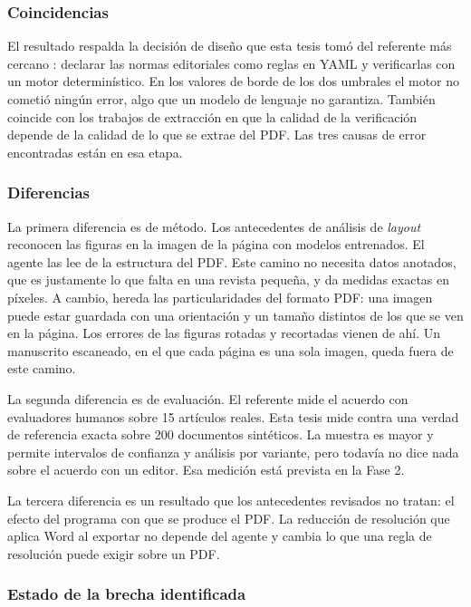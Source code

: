 \subsubsection*{Coincidencias}

El resultado respalda la decisión de diseño que esta tesis tomó del referente más cercano \cite{ref9}: declarar las normas editoriales como reglas en YAML y verificarlas con un motor determinístico. En los valores de borde de los dos umbrales el motor no cometió ningún error, algo que un modelo de lenguaje no garantiza. También coincide con los trabajos de extracción \cite{ref4} en que la calidad de la verificación depende de la calidad de lo que se extrae del PDF. Las tres causas de error encontradas están en esa etapa.

\subsubsection*{Diferencias}

La primera diferencia es de método. Los antecedentes de análisis de \emph{layout} \cite{ref17,ref21} reconocen las figuras en la imagen de la página con modelos entrenados. El agente las lee de la estructura del PDF. Este camino no necesita datos anotados, que es justamente lo que falta en una revista pequeña, y da medidas exactas en píxeles. A cambio, hereda las particularidades del formato PDF: una imagen puede estar guardada con una orientación y un tamaño distintos de los que se ven en la página. Los errores de las figuras rotadas y recortadas vienen de ahí. Un manuscrito escaneado, en el que cada página es una sola imagen, queda fuera de este camino.

La segunda diferencia es de evaluación. El referente \cite{ref9} mide el acuerdo con evaluadores humanos sobre 15 artículos reales. Esta tesis mide contra una verdad de referencia exacta sobre 200 documentos sintéticos. La muestra es mayor y permite intervalos de confianza y análisis por variante, pero todavía no dice nada sobre el acuerdo con un editor. Esa medición está prevista en la Fase 2.

La tercera diferencia es un resultado que los antecedentes revisados no tratan: el efecto del programa con que se produce el PDF. La reducción de resolución que aplica Word al exportar no depende del agente y cambia lo que una regla de resolución puede exigir sobre un PDF.

\subsubsection*{Estado de la brecha identificada}

